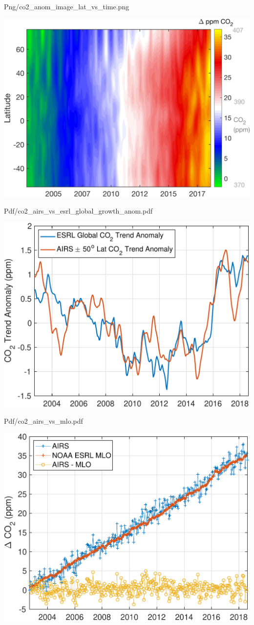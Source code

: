 \documentclass[presentation]{beamer}
\begin{document}
\begin{frame}[label={sec:orgff22418}]{Png/co2\_anom\_image\_lat\_vs\_time.png}
\begin{center}
\includegraphics[width=0.7\linewidth]{./Figs/Png/co2_anom_image_lat_vs_time.png}
\end{center}
\end{frame}

\begin{frame}[label={sec:org29a70c6}]{Pdf/co2\_airs\_vs\_esrl\_global\_growth\_anom.pdf}
\begin{center}
\includegraphics[width=0.7\linewidth]{./Figs/Pdf/co2_airs_vs_esrl_global_growth_anom.pdf}
\end{center}
\end{frame}

\begin{frame}[label={sec:org94b7c72}]{Pdf/co2\_airs\_vs\_mlo.pdf}
\begin{center}
\includegraphics[width=0.7\linewidth]{./Figs/Pdf/co2_airs_vs_mlo.pdf}
\end{center}
\end{frame}
\end{document}

